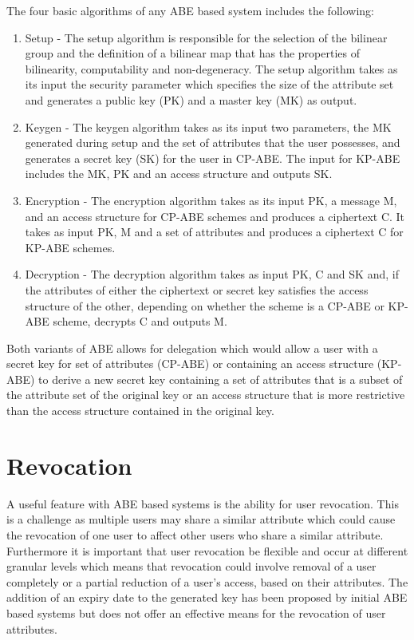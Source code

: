 The four basic algorithms of any ABE based system includes the following:

\begin{enumerate}
	
	\item Setup -  The setup algorithm is responsible for the selection of the bilinear group and the definition of a bilinear map that has the properties of bilinearity, computability and non-degeneracy. The setup algorithm takes as its input the security parameter which specifies the size of the attribute set and generates a public key (PK) and a master key (MK) as output.
	
	\item Keygen - The keygen algorithm takes as its input two parameters, the MK generated during setup and the set of attributes that the user possesses, and generates a secret key (SK) for the user in CP-ABE. The input for KP-ABE includes the MK, PK and an access structure and outputs SK.
	
	\item Encryption - The encryption algorithm takes as its input PK, a message M, and an access structure for CP-ABE schemes and produces a ciphertext C. It takes as input PK, M and a set of attributes and produces a ciphertext C for KP-ABE schemes.
	
	\item Decryption - The decryption algorithm takes as input PK, C and SK and, if the attributes of either the ciphertext or secret key satisfies the access structure of the other, depending on whether the scheme is a CP-ABE or KP-ABE scheme, decrypts C and outputs M.
	
\end{enumerate}

Both variants of ABE allows for delegation which would allow a user with a secret key for set of attributes (CP-ABE) or containing an access structure (KP-ABE) to derive a new secret key containing a set of attributes that is a subset of the attribute set of the original key or an access structure that is more restrictive than the access structure contained in the original key.

\section{Revocation}

A useful feature with ABE based systems is the ability for user revocation. This is a challenge as multiple users may share a similar attribute which could cause the revocation of one user to affect other users who share a similar attribute. Furthermore it is important that user revocation be flexible and occur at different granular levels which means that revocation could involve removal of a user completely or a partial reduction of a user’s access, based on their attributes. The addition of an expiry date to the generated key has been proposed by initial ABE based systems \cite{Bethencourt2007} but does not offer an effective means for the revocation of user attributes.

